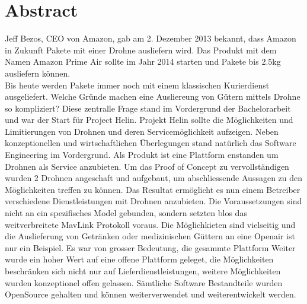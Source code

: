 \newpage
{}
\chapter*{Abstract}
Jeff Bezos, CEO von Amazon, gab am 2. Dezember 2013 bekannt, dass Amazon in Zukunft Pakete mit einer Drohne ausliefern wird. Das Produkt mit dem Namen Amazon Prime Air sollte im Jahr 2014 starten und Pakete bis 2.5kg ausliefern können. \\
Bis heute werden Pakete immer noch mit einem klassischen Kurierdienst ausgeliefert. Welche Gründe machen eine Ausliereung von Gütern mittels Drohne so kompliziert? Diese zentralle Frage stand im Vordergrund der Bachelorarbeit und war der Start für Project Helin. 
Projekt Helin sollte die Möglichkeiten und Limitierungen von Drohnen und deren Servicemöglichkeit aufzeigen.
Neben konzeptionellen und wirtschaftlichen Überlegungen stand natürlich das Software Engineering im Vordergrund. Als Produkt ist eine Plattform enstanden um Drohnen als Service anzubieten. Um das Proof of Concept zu vervollständigen wurden 2 Drohnen angeschaft und aufgebaut, um abschliessende Aussagen zu den Möglichkeiten treffen zu können. Das Resultat ermöglicht es nun einem Betreiber verschiedene Dienstleistungen mit Drohnen anzubieten. Die Voraussetzungen sind nicht an ein spezifisches Model gebunden, sondern setzten blos das weitverbreitete MavLink Protokoll voraus. Die Möglichkieten sind vielseitig und die Auslieferung von Getränken oder medizinischen Güttern an eine Openair ist nur ein Beispiel. Es war von grosser Bedeutung, die gesammte Plattform  Weiter wurde ein hoher Wert auf eine offene Plattform geleget, die Möglichkeiten beschränken sich nicht nur auf Lieferdienstleistungen, weitere Möglichkeiten wurden konzeptionel offen gelassen. Sämtliche Software Bestandteile wurden OpenSource gehalten und können weiterverwendet und weiterentwickelt werden.